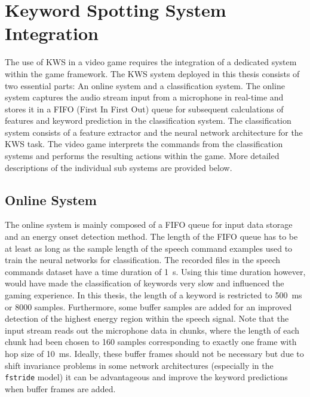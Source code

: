 
\section{Keyword Spotting System Integration}
The use of KWS in a video game requires the integration of a dedicated system within the game framework.
The KWS system deployed in this thesis consists of two essential parts: An online system and a classification system.
The online system captures the audio stream input from a microphone in real-time and stores it in a FIFO (First In First Out) queue for subsequent calculations of features and keyword prediction in the classification system.
The classification system consists of a feature extractor and the neural network architecture for the KWS task.
The video game interprets the commands from the classification systems and performs the resulting actions within the game.
More detailed descriptions of the individual sub systems are provided below.



\subsection{Online System}
The online system is mainly composed of a FIFO queue for input data storage and an energy onset detection method.
The length of the FIFO queue has to be at least as long as the sample length of the speech command examples used to train the neural networks for classification.
The recorded files in the speech commands dataset have a time duration of \SI{1}{\second}. 
Using this time duration however, would have made the classification of keywords very slow and influenced the gaming experience.
In this thesis, the length of a keyword is restricted to \SI{500}{\milli\second} or 8000 samples.
Furthermore, some buffer samples are added for an improved detection of the highest energy region within the speech signal.
Note that the input stream reads out the microphone data in chunks, where the length of each chunk had been chosen to 160 samples corresponding to exactly one frame with hop size of \SI{10}{\milli\second}.
Ideally, these buffer frames should not be necessary but due to shift invariance problems in some network architectures (especially in the \texttt{fstride} model) it can be advantageous and improve the keyword predictions when buffer frames are added.

